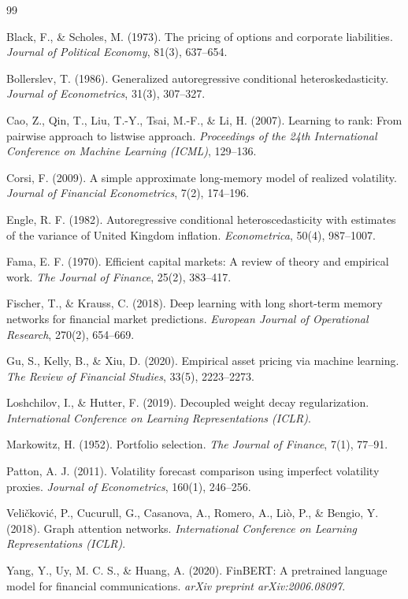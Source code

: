 \documentclass[12pt, a4paper]{article}
\begin{document}
\begin{thebibliography}{99}

Black, F., \& Scholes, M. (1973).
The pricing of options and corporate liabilities.
\textit{Journal of Political Economy}, 81(3), 637--654.

Bollerslev, T. (1986).
Generalized autoregressive conditional heteroskedasticity.
\textit{Journal of Econometrics}, 31(3), 307--327.

Cao, Z., Qin, T., Liu, T.-Y., Tsai, M.-F., \& Li, H. (2007).
Learning to rank: From pairwise approach to listwise approach.
\textit{Proceedings of the 24th International Conference on Machine Learning (ICML)}, 129--136.

Corsi, F. (2009).
A simple approximate long-memory model of realized volatility.
\textit{Journal of Financial Econometrics}, 7(2), 174--196.

Engle, R. F. (1982).
Autoregressive conditional heteroscedasticity with estimates of the variance of United Kingdom inflation.
\textit{Econometrica}, 50(4), 987--1007.

Fama, E. F. (1970).
Efficient capital markets: A review of theory and empirical work.
\textit{The Journal of Finance}, 25(2), 383--417.

Fischer, T., \& Krauss, C. (2018).
Deep learning with long short-term memory networks for financial market predictions.
\textit{European Journal of Operational Research}, 270(2), 654--669.

Gu, S., Kelly, B., \& Xiu, D. (2020).
Empirical asset pricing via machine learning.
\textit{The Review of Financial Studies}, 33(5), 2223--2273.

Loshchilov, I., \& Hutter, F. (2019).
Decoupled weight decay regularization.
\textit{International Conference on Learning Representations (ICLR)}.

Markowitz, H. (1952).
Portfolio selection.
\textit{The Journal of Finance}, 7(1), 77--91.

Patton, A. J. (2011).
Volatility forecast comparison using imperfect volatility proxies.
\textit{Journal of Econometrics}, 160(1), 246--256.

Veli\v{c}kovi\'{c}, P., Cucurull, G., Casanova, A., Romero, A., Li\`{o}, P., \& Bengio, Y. (2018).
Graph attention networks.
\textit{International Conference on Learning Representations (ICLR)}.

Yang, Y., Uy, M. C. S., \& Huang, A. (2020).
FinBERT: A pretrained language model for financial communications.
\textit{arXiv preprint arXiv:2006.08097}.

\end{thebibliography}
\end{document}
